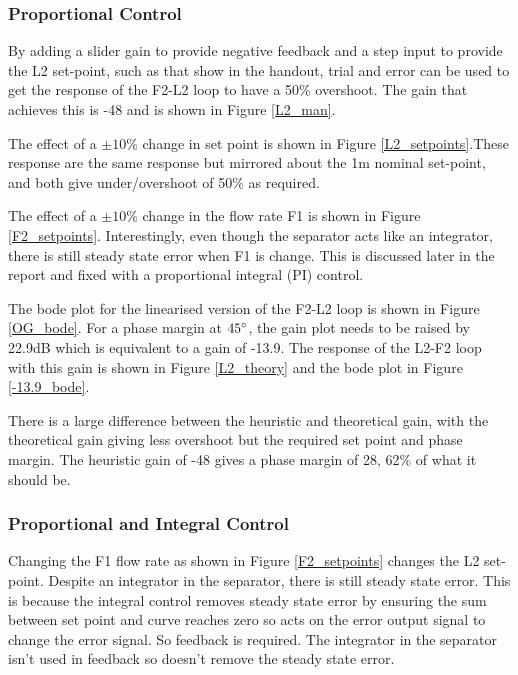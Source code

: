 \documentclass[11pt]{article}
\begin{document}
\subsubsection{Proportional Control}

By adding a slider gain to provide negative feedback and a step input to provide the L2 set-point, such as that show in the handout, trial and error can be used to get the response of the F2-L2 loop to have a 50\% overshoot. The gain that achieves this is -48 and is shown in Figure \ref{L2_man}.

The effect of a $\pm10\%$ change in set point is shown in Figure \ref{L2_setpoints}.These response are the same response but mirrored about the 1m nominal set-point, and both give under/overshoot of 50\% as required.

The effect of a $\pm10\%$ change in the flow rate F1 is shown in Figure \ref{F2_setpoints}. Interestingly, even though the separator acts like an integrator, there is still steady state error when F1 is change. This is discussed later in the report and fixed with a proportional integral (PI) control.

The bode plot for the linearised version of the F2-L2 loop is shown in Figure \ref{OG_bode}. For a phase margin at $45\degree$, the gain plot needs to be raised by 22.9dB which is equivalent to a gain of -13.9. The response of the L2-F2 loop with this gain is shown in Figure \ref{L2_theory} and the bode plot in Figure \ref{-13.9_bode}. 

There is a large difference between the heuristic and theoretical gain, with the theoretical gain giving less overshoot but the required set point and phase margin. The heuristic gain of -48 gives a phase margin of 28\degree, 62\% of what it should be. 

\subsubsection{Proportional and Integral Control}
Changing the F1 flow rate as shown in Figure \ref{F2_setpoints} changes the L2 set-point. Despite an integrator in the separator, there is still steady state error. This is because the integral control removes steady state error by ensuring the sum between set point and curve reaches zero so acts on the error output signal to change the error signal. So feedback is required. The integrator in the separator isn't used in feedback so doesn't remove the steady state error. 
\end{document}
